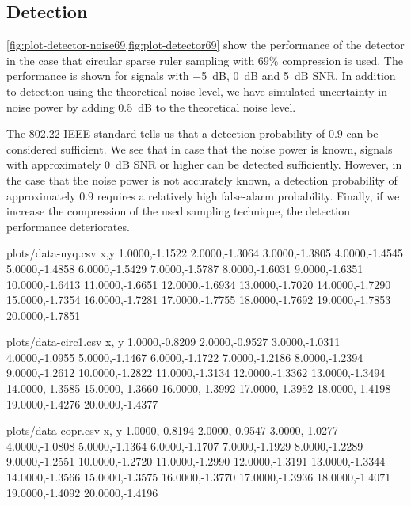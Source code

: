 \documentclass[a4paper, openany, oneside]{memoir}
\begin{document}
\subsection{Detection}
\cref{fig:plot-detector-noise69,fig:plot-detector69} show the performance of the detector in the case that circular sparse ruler sampling with $69\%$ compression is used. The performance is shown for signals with \SI{-5}{dB}, \SI{0}{dB} and \SI{5}{dB} SNR. In addition to detection using the theoretical noise level, we have simulated uncertainty in noise power by adding \SI{0.5}{dB} to the theoretical noise level.

The 802.22 IEEE standard tells us that a detection probability of $0.9$ can be considered sufficient. We see that in case that the noise power is known, signals with approximately \SI{0}{dB} SNR or higher can be detected sufficiently. However, in the case that the noise power is not accurately known, a detection probability of approximately $0.9$ requires a relatively high false-alarm probability. Finally, if we increase the compression of the used sampling technique, the detection performance deteriorates.

\begin{filecontents*}{plots/data-nyq.csv}
x,y
1.0000,-1.1522
2.0000,-1.3064
3.0000,-1.3805
4.0000,-1.4545
5.0000,-1.4858
6.0000,-1.5429
7.0000,-1.5787
8.0000,-1.6031
9.0000,-1.6351
10.0000,-1.6413
11.0000,-1.6651
12.0000,-1.6934
13.0000,-1.7020
14.0000,-1.7290
15.0000,-1.7354
16.0000,-1.7281
17.0000,-1.7755
18.0000,-1.7692
19.0000,-1.7853
20.0000,-1.7851
\end{filecontents*}

\begin{filecontents*}{plots/data-circ1.csv}
x, y
1.0000,-0.8209
2.0000,-0.9527
3.0000,-1.0311
4.0000,-1.0955
5.0000,-1.1467
6.0000,-1.1722
7.0000,-1.2186
8.0000,-1.2394
9.0000,-1.2612
10.0000,-1.2822
11.0000,-1.3134
12.0000,-1.3362
13.0000,-1.3494
14.0000,-1.3585
15.0000,-1.3660
16.0000,-1.3992
17.0000,-1.3952
18.0000,-1.4198
19.0000,-1.4276
20.0000,-1.4377
\end{filecontents*}


\begin{filecontents*}{plots/data-copr.csv}
x, y
1.0000,-0.8194
2.0000,-0.9547
3.0000,-1.0277
4.0000,-1.0808
5.0000,-1.1364
6.0000,-1.1707
7.0000,-1.1929
8.0000,-1.2289
9.0000,-1.2551
10.0000,-1.2720
11.0000,-1.2990
12.0000,-1.3191
13.0000,-1.3344
14.0000,-1.3566
15.0000,-1.3575
16.0000,-1.3770
17.0000,-1.3936
18.0000,-1.4071
19.0000,-1.4092
20.0000,-1.4196
\end{filecontents*}
\end{document}
